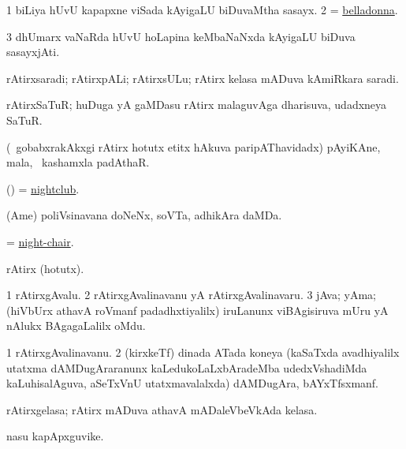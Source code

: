\noindent
\gl{\pagu}
\bmng
\bnum
\num{1}  biLiya hUvU kapapxne viSada kAyigaLU biDuvaMtha sasayx. 
\num{2}  = \hyperref{kandict_b.pdf}{B}{belladonna}{belladonna}. 
\num{3}  dhUmarx vaNaRda hUvU hoLapina keMbaNaNxda kAyigaLU biDuva sasayxjAti. 
\enum
\emng
\eentry

\bentry
{}
\gl{\nA}
\bmng
rAtirxsaradi; rAtirxpALi; rAtirxsULu; rAtirx kelasa mADuva kAmiRkara saradi. 
\emng
\eentry

\bentry
{}
\gl{\nA}
\bmng
rAtirxSaTuR; huDuga yA gaMDasu rAtirx malaguvAga dharisuva, udadxneya SaTuR. 
\emng
\eentry

\bentry
{}
\gl{\nA}
\bmng
(\kanmu\ gobabxrakAkxgi rAtirx hotutx etitx hAkuva paripAThavidadx) pAyiKAne, mala, \mo\ kashamxla padAthaR. 
\emng
\eentry

\bentry
{}
\gl{\nA}
\bmng
(\AmA) = \hyperlink{nightclub}{nightclub}. 
\emng
\eentry

\bentry
{}
\gl{\nA}
\bmng
(Ame) poliVsinavana doNeNx, soVTa, adhikAra daMDa. 
\emng
\eentry

\bentry
{}
\gl{\nA}
\bmng
= \hyperlink{night-chair}{night-chair}. 
\emng
\eentry

\bentry
{}
\gl{\nA}
\bmng
rAtirx (hotutx). 
\emng
\eentry

\bentry
{}
\gl{\nA}
\bmng
\bnum
\num{1} rAtirxgAvalu. 
\num{2} rAtirxgAvalinavanu yA rAtirxgAvalinavaru. 
\num{3} jAva; yAma; (hiVbUrx athavA roVmanf padadhxtiyalilx) iruLanunx viBAgisiruva mUru yA nAlukx BAgagaLalilx oMdu. 
\enum
\emng
\eentry

\bentry
{}
\gl{\nA}
\bmng
\bnum
\num{1} rAtirxgAvalinavanu. 
\num{2} (kirxkeTf) dinada ATada koneya (kaSaTxda avadhiyalilx utatxma dAMDugAraranunx kaLedukoLaLxbAradeMba udedxVshadiMda kaLuhisalAguva, aSeTxVnU utatxmavalalxda) dAMDugAra, bAYxTfsxmanf. 
\enum
\emng
\eentry

\bentry
{}
\gl{\nA}
\bmng
rAtirxgelasa; rAtirx mADuva athavA mADaleVbeVkAda kelasa. 
\emng
\eentry

\bentry
{}
\gl{\nA}
\bmng
nasu kapApxguvike. 
\emng
\eentry

